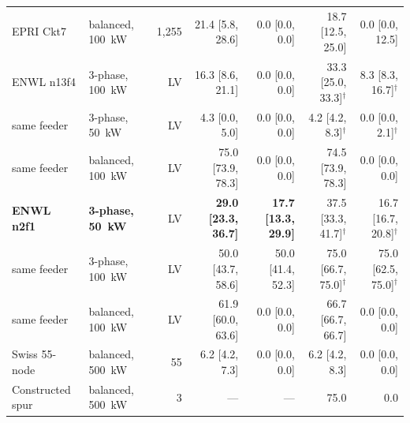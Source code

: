 \documentclass[review,authoryear,12pt]{elsarticle}
\begin{document}
\begin{table}[htbp]
\begin{tabular}{@{}llrrrrr@{}}
EPRI Ckt7           & balanced, 100~kW & 1{,}255 & 21.4 [5.8, 28.6] & 0.0 [0.0, 0.0] & 18.7 [12.5, 25.0] & 0.0 [0.0, 12.5] \\
ENWL n13f4          & 3-phase, 100~kW & LV      & 16.3 [8.6, 21.1] & 0.0 [0.0, 0.0] & 33.3 [25.0, 33.3]$^{\dagger}$ & 8.3 [8.3, 16.7]$^{\dagger}$ \\
\quad same feeder    & 3-phase, 50~kW  & LV      & 4.3 [0.0, 5.0] & 0.0 [0.0, 0.0] & 4.2 [4.2, 8.3]$^{\dagger}$ & 0.0 [0.0, 2.1]$^{\dagger}$ \\
\quad same feeder    & balanced, 100~kW & LV      & 75.0 [73.9, 78.3] & 0.0 [0.0, 0.0] & 74.5 [73.9, 78.3] & 0.0 [0.0, 0.0] \\
\textbf{ENWL n2f1}  & \textbf{3-phase, 50~kW} & LV & \textbf{29.0 [23.3, 36.7]} & \textbf{17.7 [13.3, 29.9]} & 37.5 [33.3, 41.7]$^{\dagger}$ & 16.7 [16.7, 20.8]$^{\dagger}$ \\
\quad same feeder    & 3-phase, 100~kW & LV      & 50.0 [43.7, 58.6] & 50.0 [41.4, 52.3] & 75.0 [66.7, 75.0]$^{\dagger}$ & 75.0 [62.5, 75.0]$^{\dagger}$ \\
\quad same feeder    & balanced, 100~kW & LV      & 61.9 [60.0, 63.6] & 0.0 [0.0, 0.0] & 66.7 [66.7, 66.7] & 0.0 [0.0, 0.0] \\
Swiss 55-node       & balanced, 500~kW & 55      & 6.2 [4.2, 7.3] & 0.0 [0.0, 0.0] & 6.2 [4.2, 8.3] & 0.0 [0.0, 0.0] \\
Constructed spur    & balanced, 500~kW & 3       & ---         & --- & 75.0 & 0.0 \\
\bottomrule
\end{tabular}
\end{table}
\end{document}
